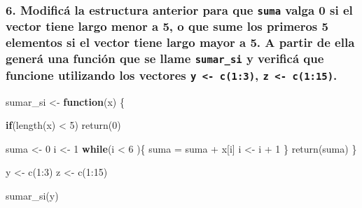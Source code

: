 \documentclass[
]{article}
\newenvironment{Shaded}{\begin{snugshade}}{\end{snugshade}}
\newcommand{\ControlFlowTok}[1]{\textcolor[rgb]{0.13,0.29,0.53}{\textbf{#1}}}
\newcommand{\DecValTok}[1]{\textcolor[rgb]{0.00,0.00,0.81}{#1}}
\newcommand{\FunctionTok}[1]{\textcolor[rgb]{0.00,0.00,0.00}{#1}}
\newcommand{\NormalTok}[1]{#1}
\newcommand{\OtherTok}[1]{\textcolor[rgb]{0.56,0.35,0.01}{#1}}
\newcommand{\SpecialCharTok}[1]{\textcolor[rgb]{0.00,0.00,0.00}{#1}}
\begin{document}
\hypertarget{modificuxe1-la-estructura-anterior-para-que-suma-valga-0-si-el-vector-tiene-largo-menor-a-5-o-que-sume-los-primeros-5-elementos-si-el-vector-tiene-largo-mayor-a-5.-a-partir-de-ella-generuxe1-una-funciuxf3n-que-se-llame-sumar_si-y-verificuxe1-que-funcione-utilizando-los-vectores-y---c13-z---c115.}{%
\subsubsection{\texorpdfstring{6. Modificá la estructura anterior para
que \texttt{suma} valga 0 si el vector tiene largo menor a 5, o que sume
los primeros 5 elementos si el vector tiene largo mayor a 5. A partir de
ella generá una función que se llame \texttt{sumar\_si} y verificá que
funcione utilizando los vectores \texttt{y\ \textless{}-\ c(1:3)},
\texttt{z\ \textless{}-\ c(1:15)}.}{6. Modificá la estructura anterior para que suma valga 0 si el vector tiene largo menor a 5, o que sume los primeros 5 elementos si el vector tiene largo mayor a 5. A partir de ella generá una función que se llame sumar\_si y verificá que funcione utilizando los vectores y \textless- c(1:3), z \textless- c(1:15).}}\label{modificuxe1-la-estructura-anterior-para-que-suma-valga-0-si-el-vector-tiene-largo-menor-a-5-o-que-sume-los-primeros-5-elementos-si-el-vector-tiene-largo-mayor-a-5.-a-partir-de-ella-generuxe1-una-funciuxf3n-que-se-llame-sumar_si-y-verificuxe1-que-funcione-utilizando-los-vectores-y---c13-z---c115.}}

\begin{Shaded}
\begin{Highlighting}[]
\NormalTok{sumar\_si }\OtherTok{\textless{}{-}} \ControlFlowTok{function}\NormalTok{(x) \{}
  
  \ControlFlowTok{if}\NormalTok{(}\FunctionTok{length}\NormalTok{(x) }\SpecialCharTok{\textless{}} \DecValTok{5}\NormalTok{) }\FunctionTok{return}\NormalTok{(}\DecValTok{0}\NormalTok{)}
  
\NormalTok{  suma }\OtherTok{\textless{}{-}} \DecValTok{0}
\NormalTok{  i }\OtherTok{\textless{}{-}} \DecValTok{1}
  \ControlFlowTok{while}\NormalTok{(i }\SpecialCharTok{\textless{}} \DecValTok{6}\NormalTok{ )\{}
\NormalTok{    suma }\OtherTok{=}\NormalTok{ suma }\SpecialCharTok{+}\NormalTok{ x[i]}
\NormalTok{    i }\OtherTok{\textless{}{-}}\NormalTok{ i }\SpecialCharTok{+} \DecValTok{1}
\NormalTok{  \}}
  \FunctionTok{return}\NormalTok{(suma)}
\NormalTok{\}}

\NormalTok{y }\OtherTok{\textless{}{-}} \FunctionTok{c}\NormalTok{(}\DecValTok{1}\SpecialCharTok{:}\DecValTok{3}\NormalTok{)}
\NormalTok{z }\OtherTok{\textless{}{-}} \FunctionTok{c}\NormalTok{(}\DecValTok{1}\SpecialCharTok{:}\DecValTok{15}\NormalTok{)}

\FunctionTok{sumar\_si}\NormalTok{(y)}
\end{Highlighting}
\end{Shaded}
\end{document}
